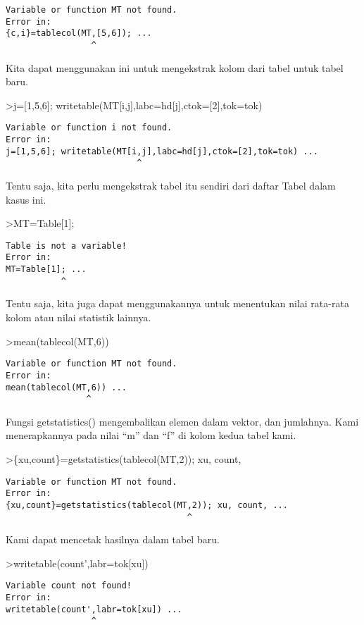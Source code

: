 \documentclass[
]{book}
\begin{document}
\begin{verbatim}
Variable or function MT not found.
Error in:
{c,i}=tablecol(MT,[5,6]); ...
                 ^
\end{verbatim}

Kita dapat menggunakan ini untuk mengekstrak kolom dari tabel untuk tabel baru.

\textgreater j={[}1,5,6{]}; writetable(MT{[}i,j{]},labc=hd{[}j{]},ctok={[}2{]},tok=tok)

\begin{verbatim}
Variable or function i not found.
Error in:
j=[1,5,6]; writetable(MT[i,j],labc=hd[j],ctok=[2],tok=tok) ...
                          ^
\end{verbatim}

Tentu saja, kita perlu mengekstrak tabel itu sendiri dari daftar Tabel dalam kasus ini.

\textgreater MT=Table{[}1{]};

\begin{verbatim}
Table is not a variable!
Error in:
MT=Table[1]; ...
           ^
\end{verbatim}

Tentu saja, kita juga dapat menggunakannya untuk menentukan nilai rata-rata kolom atau nilai statistik lainnya.

\textgreater mean(tablecol(MT,6))

\begin{verbatim}
Variable or function MT not found.
Error in:
mean(tablecol(MT,6)) ...
                ^
\end{verbatim}

Fungsi getstatistics() mengembalikan elemen dalam vektor, dan jumlahnya. Kami menerapkannya pada nilai ``m'' dan ``f'' di kolom kedua tabel kami.

\textgreater\{xu,count\}=getstatistics(tablecol(MT,2)); xu, count,

\begin{verbatim}
Variable or function MT not found.
Error in:
{xu,count}=getstatistics(tablecol(MT,2)); xu, count, ...
                                    ^
\end{verbatim}

Kami dapat mencetak hasilnya dalam tabel baru.

\textgreater writetable(count',labr=tok{[}xu{]})

\begin{verbatim}
Variable count not found!
Error in:
writetable(count',labr=tok[xu]) ...
                 ^
\end{verbatim}
\end{document}
